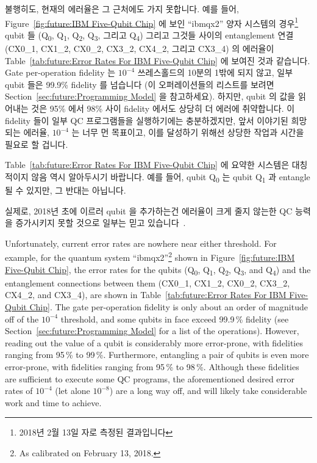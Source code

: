 불행히도, 현재의 에러율은 그 근처에도 가지 못합니다.
예를 들어,
Figure~\ref{fig:future:IBM Five-Qubit Chip} 에 보인 ``ibmqx2'' 양자 시스템의
경우\footnote{
	2018년 2월 13일 자로 측정된 결과입니다}
qubit 들
(Q\textsubscript{0}, 
Q\textsubscript{1}, 
Q\textsubscript{2}, 
Q\textsubscript{3}, 그리고
Q\textsubscript{4})
그리고 그것들 사이의 entanglement 연결
(CX0\_1,
CX1\_2,
CX0\_2,
CX3\_2,
CX4\_2, 그리고
CX3\_4)
의 에러율이
Table~\ref{tab:future:Error Rates For IBM Five-Qubit Chip} 에 보여진 것과
같습니다.
Gate per-operation fidelity 는 $10^{-4}$ 쓰레스홀드의 10분의 1밖에 되지 않고,
일부 qubit 들은 99.9\% fidelity 를 넘습니다 (이 오퍼레이션들의 리스트를 보려면
Section~\ref{sec:future:Programming Model} 을 참고하세요).
하지만, qubit 의 값을 읽어내는 것은 95\% 에서 98\% 사이 fidelity 에서도 상당히
더 에러에 취약합니다.
이 fidelity 들이 일부 QC 프로그램들을 실행하기에는 충분하겠지만, 앞서 이야기된
희망되는 에러율, $10^{-4}$ 는 너무 먼 목표이고, 이를 달성하기 위해선 상당한
작업과 시간을 필요로 할 겁니다.

Table~\ref{tab:future:Error Rates For IBM Five-Qubit Chip}
에 요약한 시스템은 대칭적이지 않음 역시 알아두시기 바랍니다.
예를 들어, qubit Q\textsubscript{0} 는 qubit Q\textsubscript{1} 과 entangle 될
수 있지만, 그 반대는 아닙니다.

실제로, 2018년 초에 이르러 qubit 을 추가하는건 에러율이 크게 줄지 않는한 QC
능력을 증가시키지 못할 것으로 일부는 믿고
있습니다~\cite{IBMResearch2018QuantumVolume,TheEconomist2018QualityOverQuantity}.
\iffalse

Unfortunately, current error rates are nowhere near either threshold.
For example, for the quantum system ``ibmqx2''\footnote{
	As calibrated on February 13, 2018.}
shown in
Figure~\ref{fig:future:IBM Five-Qubit Chip},
the error rates for the qubits
(Q\textsubscript{0}, 
Q\textsubscript{1}, 
Q\textsubscript{2}, 
Q\textsubscript{3}, and
Q\textsubscript{4})
and the entanglement connections between them
(CX0\_1,
CX1\_2,
CX0\_2,
CX3\_2,
CX4\_2, and
CX3\_4),
are shown in
Table~\ref{tab:future:Error Rates For IBM Five-Qubit Chip}.
The gate per-operation fidelity is only about an order of magnitude
off of the $10^{-4}$ threshold, and some qubits in face exceed 99.9\,\%
fidelity (see Section~\ref{sec:future:Programming Model} for a list of
the operations).
However, reading out the value of a qubit is considerably more
error-prone, with fidelities ranging from 95\,\% to 99\,\%.
Furthermore, entangling a pair of qubits is even more error-prone,
with fidelities ranging from 95\,\% to 98\,\%.
Although these fidelities are sufficient to execute some QC programs, the
aforementioned desired error rates of $10^{-4}$ (let alone $10^{-8}$) are a
long way off, and will likely take considerable work and time to achieve.

